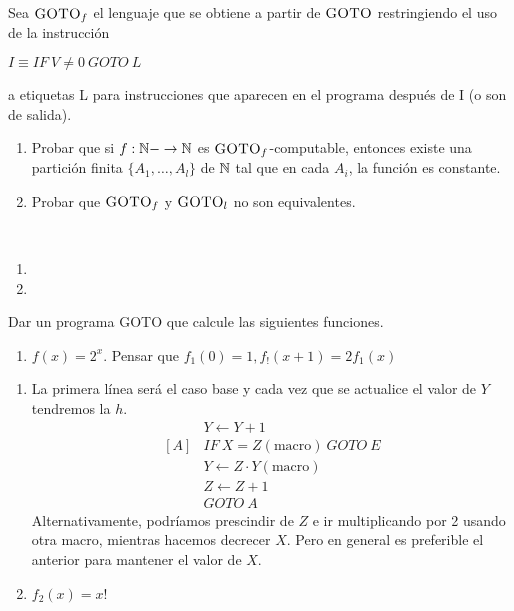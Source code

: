 \documentclass[twoside]{article}
\begin{document}
\begin{ejercicio}{16}
Sea $\textsc{GOTO}_f$ el lenguaje que se obtiene a partir de $\textsc{GOTO}$ restringiendo el uso de la
instrucción

$I\equiv IF\ V\neq 0\ GOTO\ L$

a etiquetas L para instrucciones que aparecen en el programa después de I (o son de salida).

\begin{enumerate}
\item Probar que si $f : \mathbb{N}- \to \mathbb{N}$ es $\textsc{GOTO}_f$-computable, entonces existe una partición finita
$\{A_1,\dots,A_l\}$ de $\mathbb{N}$ tal que en cada $A_i$, la función es constante.
\item Probar que $\textsc{GOTO}_f$ y $\textsc{GOTO}_l$ no son equivalentes.
\end{enumerate}
\end{ejercicio}
\begin{solucion}\
\begin{enumerate}
\item
\item 
\end{enumerate}
\end{solucion}

\newpage

\begin{ejercicio}{}
Dar un programa GOTO que calcule las siguientes funciones.
\begin{enumerate}
\item $f(x)=2^x$. Pensar que $f_1(0)=1, f_!(x+1)=2f_1(x)$
\end{enumerate}
\end{ejercicio}

\begin{solucion}
\begin{enumerate}

\item La primera línea será el caso base y cada vez que se actualice el valor de $Y$ tendremos la $h$. 
\begin{align*}
&Y\leftarrow Y+1\\
[A]&IF\ X=Z(\text{macro})\ GOTO\ E\\
&Y\leftarrow Z\cdot Y (\text{macro})\\
&Z\leftarrow Z+1\\
&GOTO\ A
\end{align*}
Alternativamente, podríamos prescindir de $Z$ e ir multiplicando por 2 usando otra macro, mientras hacemos decrecer $X$. Pero en general es preferible el anterior para mantener el valor de $X$. 

\item $f_2(x)=x!$
\end{enumerate}
\end{solucion}
\end{document}
